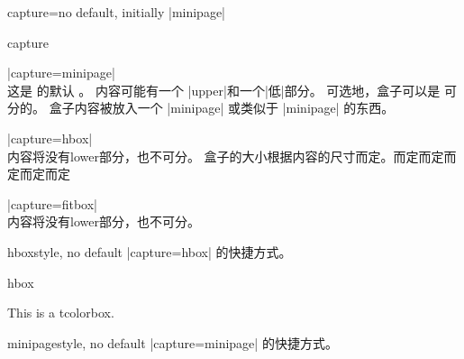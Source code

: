 \begin{docTcbKey}{capture}{=}{no default, initially |minipage|}
\begin{exdispExample}{capture}

\begin{tcolorbox}[capture=minipage]
|capture=minipage|\\
这是  的默认  。%
内容可能有一个 |upper|和一个|低|部分。%
\tcblower
可选地，盒子可以是  可分的。
盒子内容被放入一个 |minipage| 或类似于 |minipage| 的东西。
\end{tcolorbox}

\begin{tcolorbox}[capture=hbox]
|capture=hbox|\\
内容将没有lower部分，也不可分。%
盒子的大小根据内容的尺寸而定。而定而定而定而定而定%
\end{tcolorbox}

\begin{tcolorbox}[capture=fitbox,height=9mm]%
|capture=fitbox|\\
内容将没有lower部分，也不可分。
\end{tcolorbox}
\end{exdispExample}
\end{docTcbKey}




\begin{docTcbKey}{hbox}{}{style, no default}
|capture=hbox| 的快捷方式。
\begin{exdispExample}{hbox}

\begin{tcolorbox}[hbox]
This is a tcolorbox.
\end{tcolorbox}
\end{exdispExample}
\end{docTcbKey}


\begin{docTcbKey}{minipage}{}{style, no default}
  |capture=minipage| 的快捷方式。
\end{docTcbKey}




